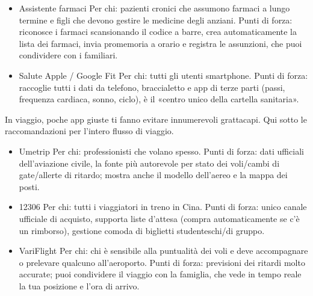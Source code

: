 
\begin{itemize}
  \item Assistente farmaci Per chi: pazienti cronici che assumono farmaci a lungo termine e figli che devono gestire le medicine degli anziani. Punti di forza: riconosce i farmaci scansionando il codice a barre, crea automaticamente la lista dei farmaci, invia promemoria a orario e registra le assunzioni, che puoi condividere con i familiari.
\end{itemize}


\begin{itemize}
  \item Salute Apple / Google Fit Per chi: tutti gli utenti smartphone. Punti di forza: raccoglie tutti i dati da telefono, braccialetto e app di terze parti (passi, frequenza cardiaca, sonno, ciclo), è il «centro unico della cartella sanitaria».
\end{itemize}


In viaggio, poche app giuste ti fanno evitare innumerevoli grattacapi. Qui sotto le raccomandazioni per l'intero flusso di viaggio.


\begin{itemize}
  \item Umetrip Per chi: professionisti che volano spesso. Punti di forza: dati ufficiali dell'aviazione civile, la fonte più autorevole per stato dei voli/cambi di gate/allerte di ritardo; mostra anche il modello dell'aereo e la mappa dei posti.
  \item 12306 Per chi: tutti i viaggiatori in treno in Cina. Punti di forza: unico canale ufficiale di acquisto, supporta liste d'attesa (compra automaticamente se c'è un rimborso), gestione comoda di biglietti studenteschi/di gruppo.
  \item VariFlight Per chi: chi è sensibile alla puntualità dei voli e deve accompagnare o prelevare qualcuno all'aeroporto. Punti di forza: previsioni dei ritardi molto accurate; puoi condividere il viaggio con la famiglia, che vede in tempo reale la tua posizione e l'ora di arrivo.
\end{itemize}


